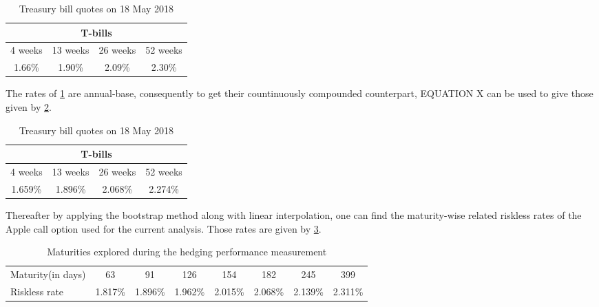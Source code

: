 \documentclass[12pt]{report}
\begin{document}
\begin{table}[ht]
\centering
\begin{tabular}{cccc}
  \hline
  \multicolumn{4}{c}{T-bills} \\
  \hline
  4 weeks & 13 weeks & 26 weeks & 52 weeks \\
  1.66\% & 1.90\% & 2.09\% & 2.30\% \\
  \hline
\end{tabular}
\caption{Treasury bill quotes on 18 May 2018} 
\label{tab:methodology:Tbill}
\end{table}

The rates of \cref{tab:methodology:Tbill} are annual-base, consequently to get their countinuously compounded counterpart, EQUATION X can be used to give those given by \cref{tab:methodology:Tbill:compound}.


\begin{table}[ht]
\centering
\begin{tabular}{cccc}
  \hline
  \multicolumn{4}{c}{T-bills} \\
  \hline
  4 weeks & 13 weeks & 26 weeks & 52 weeks \\
  1.659\% & 1.896\% & 2.068\% & 2.274\% \\
  \hline
\end{tabular}
\caption{Treasury bill quotes on 18 May 2018} 
\label{tab:methodology:Tbill:compound}
\end{table}

Thereafter by applying the bootstrap method along with linear interpolation, one can find the maturity-wise related riskless rates of the Apple call option used for the current analysis. Those rates are given by \cref{tab:methodology:tbill:maturity}.

\begin{table}[ht]
\centering
\begin{tabular}{l|ccccccc}

  \hline
Maturity(in days) & 63   & 91   & 126  & 154    & 182  & 245    & 399 \\ 
Riskless rate     &  1.817\% & 1.896\% & 1.962\% & 2.015\%  & 2.068\%  & 2.139\%   & 2.311\% \\
   \hline
\end{tabular}
\caption{Maturities explored during the hedging performance measurement} 
\label{tab:methodology:tbill:maturity}
\end{table}




\end{document}
